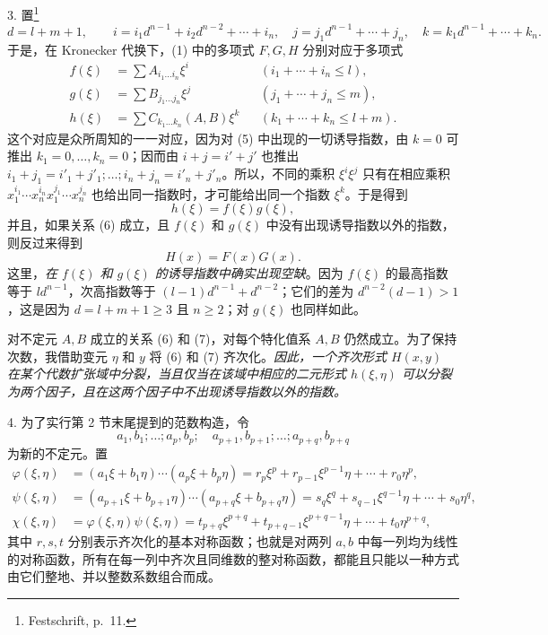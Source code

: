 3. 置\footnote{Festschrift, p.~11.}
\begin{equation}
 d=l+m+1,\qquad
 i=i_1d^{n-1}+i_2d^{n-2}+\cdots+i_n,
\quad
 j=j_1d^{n-1}+\cdots+j_n,
\quad
 k=k_1d^{n-1}+\cdots+k_n.
\tag{4}
\end{equation}
于是，在 Kronecker 代换下，(1) 中的多项式 $F,G,H$ 分别对应于多项式
\begin{equation}
\begin{aligned}
 f(\xi)&=\sum A_{i_1\ldots i_n}\xi^i &&(i_1+\cdots+i_n\le l),\\
 g(\xi)&=\sum B_{j_1\ldots j_n}\xi^j &&(j_1+\cdots+j_n\le m),\\
 h(\xi)&=\sum C_{k_1\ldots k_n}(A,B)\xi^k &&(k_1+\cdots+k_n\le l+m).
\end{aligned}
\tag{5}
\end{equation}
这个对应是众所周知的一一对应，因为对 (5) 中出现的一切诱导指数，由 $k=0$ 可推出 $k_1=0,\ldots,k_n=0$；因而由 $i+j=i'+j'$ 也推出 $i_1+j_1=i'_1+j'_1;\ldots;i_n+j_n=i'_n+j'_n$。所以，不同的乘积 $\xi^i\xi^j$ 只有在相应乘积 $x_1^{i_1}\cdots x_n^{i_n}x_1^{j_1}\cdots x_n^{j_n}$ 也给出同一指数时，才可能给出同一个指数 $\xi^k$。于是得到
\begin{equation}
 h(\xi)=f(\xi)g(\xi),
\tag{6}
\end{equation}
并且，如果关系 (6) 成立，且 $f(\xi)$ 和 $g(\xi)$ 中没有出现诱导指数以外的指数，则反过来得到
\begin{equation}
 H(x)=F(x)G(x).
\tag{7}
\end{equation}
这里，\emph{在 $f(\xi)$ 和 $g(\xi)$ 的诱导指数中确实出现空缺}。因为 $f(\xi)$ 的最高指数等于 $ld^{n-1}$，次高指数等于 $(l-1)d^{n-1}+d^{n-2}$；它们的差为 $d^{n-2}(d-1)>1$，这是因为 $d=l+m+1\ge3$ 且 $n\ge2$；对 $g(\xi)$ 也同样如此。

对不定元 $A,B$ 成立的关系 (6) 和 (7)，对每个特化值系 $A,B$ 仍然成立。为了保持次数，我借助变元 $\eta$ 和 $y$ 将 (6) 和 (7) 齐次化。\emph{因此，一个齐次形式 $H(x,y)$ 在某个代数扩张域中分裂，当且仅当在该域中相应的二元形式 $h(\xi,\eta)$ 可以分裂为两个因子，且在这两个因子中不出现诱导指数以外的指数。}

4. 为了实行第 2 节末尾提到的范数构造，令
\[
 a_1,b_1;\ldots; a_p,b_p;\quad a_{p+1},b_{p+1};\ldots; a_{p+q},b_{p+q}
\]
为新的不定元。置
\begin{equation}
\begin{aligned}
 \varphi(\xi,\eta)&=(a_1\xi+b_1\eta)\cdots(a_p\xi+b_p\eta)
     =r_p\xi^p+r_{p-1}\xi^{p-1}\eta+\cdots+r_0\eta^p,\\
 \psi(\xi,\eta)&=(a_{p+1}\xi+b_{p+1}\eta)\cdots(a_{p+q}\xi+b_{p+q}\eta)
     =s_q\xi^q+s_{q-1}\xi^{q-1}\eta+\cdots+s_0\eta^q,\\
 \chi(\xi,\eta)&=\varphi(\xi,\eta)\psi(\xi,\eta)
     =t_{p+q}\xi^{p+q}+t_{p+q-1}\xi^{p+q-1}\eta+\cdots+t_0\eta^{p+q},
\end{aligned}
\tag{8}
\end{equation}
其中 $r,s,t$ 分别表示齐次化的基本对称函数；也就是对两列 $a,b$ 中每一列均为线性的对称函数，所有在每一列中齐次且同维数的整对称函数，都能且只能以一种方式由它们整地、并以整数系数组合而成。

